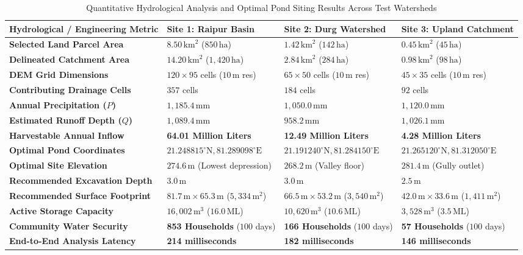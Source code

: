 \documentclass[11pt,a4paper]{article}
\begin{document}
\begin{table}[t]
\centering
\small
\caption{Quantitative Hydrological Analysis and Optimal Pond Siting Results Across Test Watersheds}
\label{tab:experimental_results}
\vspace{-0.2cm}
\begin{tabularx}{\linewidth}{p{4.2cm}XXX}
\toprule
\textbf{Hydrological / Engineering Metric} & \textbf{Site 1: Raipur Basin} & \textbf{Site 2: Durg Watershed} & \textbf{Site 3: Upland Catchment} \\
\midrule
\textbf{Selected Land Parcel Area} & $8.50\,\text{km}^2$ ($850\,\text{ha}$) & $1.42\,\text{km}^2$ ($142\,\text{ha}$) & $0.45\,\text{km}^2$ ($45\,\text{ha}$) \\
\textbf{Delineated Catchment Area} & $14.20\,\text{km}^2$ ($1,420\,\text{ha}$) & $2.84\,\text{km}^2$ ($284\,\text{ha}$) & $0.98\,\text{km}^2$ ($98\,\text{ha}$) \\
\textbf{DEM Grid Dimensions} & $120 \times 95$ cells ($10\,\text{m}$ res) & $65 \times 50$ cells ($10\,\text{m}$ res) & $45 \times 35$ cells ($10\,\text{m}$ res) \\
\textbf{Contributing Drainage Cells} & $357$ cells & $184$ cells & $92$ cells \\
\textbf{Annual Precipitation ($P$)} & $1,185.4\,\text{mm}$ & $1,050.0\,\text{mm}$ & $1,120.0\,\text{mm}$ \\
\textbf{Estimated Runoff Depth ($Q$)} & $1,089.4\,\text{mm}$ & $958.2\,\text{mm}$ & $1,026.1\,\text{mm}$ \\
\textbf{Harvestable Annual Inflow} & \textbf{64.01 Million Liters} & \textbf{12.49 Million Liters} & \textbf{4.28 Million Liters} \\
\textbf{Optimal Pond Coordinates} & $21.248815^{\circ}\text{N}, 81.289098^{\circ}\text{E}$ & $21.191240^{\circ}\text{N}, 81.284150^{\circ}\text{E}$ & $21.265120^{\circ}\text{N}, 81.312050^{\circ}\text{E}$ \\
\textbf{Optimal Site Elevation} & $274.6\,\text{m}$ (Lowest depression) & $268.2\,\text{m}$ (Valley floor) & $281.4\,\text{m}$ (Gully outlet) \\
\textbf{Recommended Excavation Depth} & $3.0\,\text{m}$ & $3.0\,\text{m}$ & $2.5\,\text{m}$ \\
\textbf{Recommended Surface Footprint} & $81.7\,\text{m} \times 65.3\,\text{m}$ ($5,334\,\text{m}^2$) & $66.5\,\text{m} \times 53.2\,\text{m}$ ($3,540\,\text{m}^2$) & $42.0\,\text{m} \times 33.6\,\text{m}$ ($1,411\,\text{m}^2$) \\
\textbf{Active Storage Capacity} & $16,002\,\text{m}^3$ ($16.0\,\text{ML}$) & $10,620\,\text{m}^3$ ($10.6\,\text{ML}$) & $3,528\,\text{m}^3$ ($3.5\,\text{ML}$) \\
\textbf{Community Water Security} & \textbf{853 Households} ($100$ days) & \textbf{166 Households} ($100$ days) & \textbf{57 Households} ($100$ days) \\
\textbf{End-to-End Analysis Latency} & \textbf{214 milliseconds} & \textbf{182 milliseconds} & \textbf{146 milliseconds} \\
\bottomrule
\end{tabularx}
\end{table}
\end{document}
